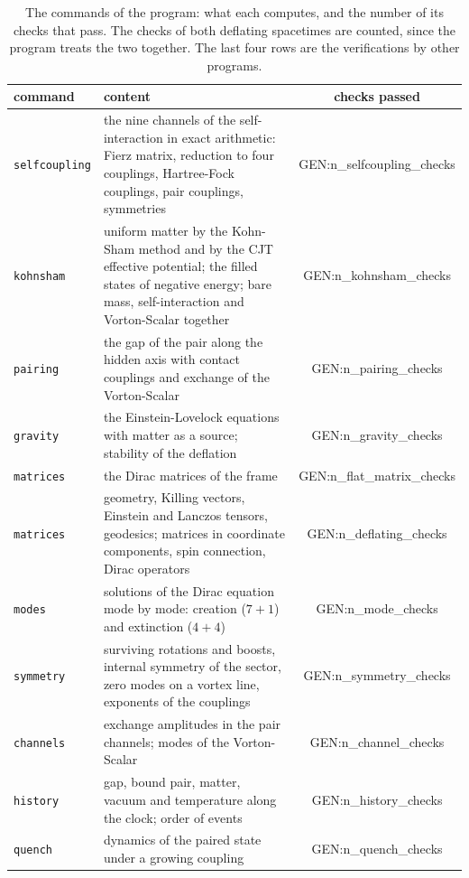 \begin{table}
\caption{\label{tab:checks}The commands of the program: what each computes, and the number of its
checks that pass. The checks of both deflating spacetimes are counted, since the program treats the
two together. The last four rows are the verifications by other programs.}
\begin{ruledtabular}
\begin{tabular}{lp{}c}
command & content & checks passed \\
\hline
\texttt{selfcoupling} & the nine channels of the self-interaction in exact arithmetic: Fierz matrix, reduction to four couplings, Hartree-Fock couplings, pair couplings, symmetries & {{GEN:n_selfcoupling_checks}} \\
\texttt{kohnsham} & uniform matter by the Kohn-Sham method and by the CJT effective potential; the filled states of negative energy; bare mass, self-interaction and Vorton-Scalar together & {{GEN:n_kohnsham_checks}} \\
\texttt{pairing} & the gap of the pair along the hidden axis with contact couplings and exchange of the Vorton-Scalar & {{GEN:n_pairing_checks}} \\
\texttt{gravity} & the Einstein-Lovelock equations with matter as a source; stability of the deflation & {{GEN:n_gravity_checks}} \\
\texttt{matrices} & the Dirac matrices of the frame & {{GEN:n_flat_matrix_checks}} \\
\texttt{matrices} & geometry, Killing vectors, Einstein and Lanczos tensors, geodesics; matrices in coordinate components, spin connection, Dirac operators & {{GEN:n_deflating_checks}} \\
\texttt{modes} & solutions of the Dirac equation mode by mode: creation ($7+1$) and extinction ($4+4$) & {{GEN:n_mode_checks}} \\
\texttt{symmetry} & surviving rotations and boosts, internal symmetry of the sector, zero modes on a vortex line, exponents of the couplings & {{GEN:n_symmetry_checks}} \\
\texttt{channels} & exchange amplitudes in the pair channels; modes of the Vorton-Scalar & {{GEN:n_channel_checks}} \\
\texttt{history} & gap, bound pair, matter, vacuum and temperature along the clock; order of events & {{GEN:n_history_checks}} \\
\texttt{quench} & dynamics of the paired state under a growing coupling & {{GEN:n_quench_checks}} \\

\end{tabular}
\end{ruledtabular}
\end{table}

